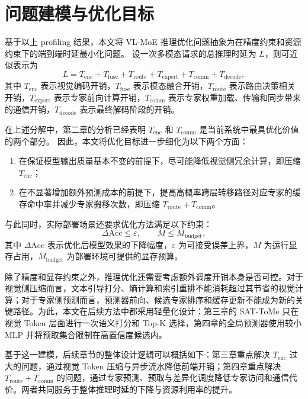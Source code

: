\section{问题建模与优化目标}
基于以上 profiling 结果，本文将 VL-MoE 推理优化问题抽象为在精度约束和资源约束下的端到端时延最小化问题。
设一次多模态请求的总推理时延为 $L$，则可近似表示为
\begin{equation}
L = T_{\mathrm{enc}} + T_{\mathrm{fuse}} + T_{\mathrm{route}} + T_{\mathrm{expert}} + T_{\mathrm{comm}} + T_{\mathrm{decode}},
\end{equation}
其中 $T_{\mathrm{enc}}$ 表示视觉编码开销，$T_{\mathrm{fuse}}$ 表示模态融合开销，$T_{\mathrm{route}}$ 表示路由决策相关开销，$T_{\mathrm{expert}}$ 表示专家前向计算开销，$T_{\mathrm{comm}}$ 表示专家权重加载、传输和同步带来的通信开销，$T_{\mathrm{decode}}$ 表示最终解码阶段的开销。

在上述分解中，第二章的分析已经表明 $T_{\mathrm{enc}}$ 和 $T_{\mathrm{comm}}$ 是当前系统中最具优化价值的两个部分。
因此，本文将优化目标进一步细化为以下两个方面：
\begin{enumerate}
\item 在保证模型输出质量基本不变的前提下，尽可能降低视觉侧冗余计算，即压缩 $T_{\mathrm{enc}}$；
\item 在不显著增加额外预测成本的前提下，提高高概率跨层转移路径对应专家的缓存命中率并减少专家搬移次数，即压缩 $T_{\mathrm{route}} + T_{\mathrm{comm}}$。
\end{enumerate}

与此同时，实际部署场景还要求优化方法满足以下约束：
\begin{equation}
\Delta \mathrm{Acc} \leq \varepsilon, \qquad
M \leq M_{\mathrm{budget}},
\end{equation}
其中 $\Delta \mathrm{Acc}$ 表示优化后模型效果的下降幅度，$\varepsilon$ 为可接受误差上界，$M$ 为运行显存占用，$M_{\mathrm{budget}}$ 为部署环境可提供的显存预算。

除了精度和显存约束之外，推理优化还需要考虑额外调度开销本身是否可控。对于视觉侧压缩而言，文本引导打分、熵计算和索引重排不能消耗超过其节省的视觉计算；对于专家侧预测而言，预测器前向、候选专家排序和缓存更新不能成为新的关键路径。为此，本文在后续方法中都采用轻量化设计：第三章的 SAT-ToMe 只在视觉 Token 层面进行一次语义打分和 Top-K 选择，第四章的全局预测器使用较小 MLP 并将预取集合限制在高置信度候选内。

基于这一建模，后续章节的整体设计逻辑可以概括如下：第三章重点解决 $T_{\mathrm{enc}}$ 过大的问题，通过视觉 Token 压缩与异步流水降低前端开销；第四章重点解决 $T_{\mathrm{route}} + T_{\mathrm{comm}}$ 的问题，通过专家预测、预取与差异化调度降低专家访问和通信代价。两者共同服务于整体推理时延的下降与资源利用率的提升。

